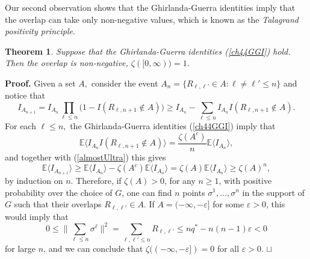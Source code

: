 \documentclass[12pt]{article}
\newcommand{\eps}{{\varepsilon}}
\newcommand{\e}{\mathbb{E}}
\newcommand{\la}{\langle}
\newcommand{\ra}{\rangle}
\newcommand\qed{\hfill\hbox{\rlap{$\sqcap$}$\sqcup$}}
\newtheorem{theorem}{Theorem}
\theoremstyle{nonumberplain}
\begin{document}
\medskip
Our second observation shows that the Ghirlanda-Guerra identities imply that the overlap can take only non-negative values, which is known as the {\it Talagrand positivity principle}.
\begin{theorem}\label{ch44ThPosit} Suppose that the Ghirlanda-Guerra identities (\ref{ch44GGI}) hold. Then the overlap is non-negative, $\zeta([0,\infty))=1.$
 \end{theorem} 
\noindent\textbf{Proof.} Given a set $A,$ consider the event 
$A_n =\{R_{\ell,\ell'} \in A : \ell\not = \ell' \leq n\}$ and notice that 
\begin{equation}
I_{A_{n+1}} 
=  I_{A_n} \prod_{\ell\leq n} \bigl(1- I(R_{\ell,n+1}\not\in A) \bigr)
\geq I_{A_n} - \sum_{\ell\leq n} I_{A_n} I(R_{\ell,n+1}\not\in A).
\label{almostUltra}
\end{equation}
For each $\ell\leq n,$ the Ghirlanda-Guerra identities (\ref{ch44GGI}) imply that 
$$
\e \bigl\la I_{A_n} I(R_{\ell,n+1}\not\in A) \bigr\ra = \frac{\zeta(A^c)}{n} \e \bigl \la I_{A_n} \bigr\ra,
$$ 
and together with (\ref{almostUltra}) this gives 
$$
\e\bigl\la I_{A_{n+1}} \bigr\ra \geq \e\bigl\la I_{A_n} \bigr\ra -\zeta(A^c) \e\bigl\la I_{A_n} \bigr\ra 
= \zeta(A) \e\bigl\la I_{A_n} \bigr\ra  \geq \zeta(A)^{n},
$$ 
by induction on $n$. Therefore, if $\zeta(A)>0$, for any $n\geq 1$, with positive probability over the choice of $G$, one can find $n$ points $\sigma^1,\ldots, \sigma^n$ in the support of $G$ such that their overlaps $R_{\ell,\ell'} \in A.$ If $A=(-\infty,-\eps]$ for some $\eps>0$, this would imply that
$$
0\leq \bigl\|\sum_{\ell\leq n} \sigma^{\ell} \bigr\|^2 = \sum_{\ell,\ell'\leq n} R_{\ell,\ell'}\leq n q^*- n(n-1)\eps <0 
$$
for large $n$, and we can conclude that $\zeta((-\infty,-\eps])=0$ for all $\eps>0$. 
\qed
\end{document}
